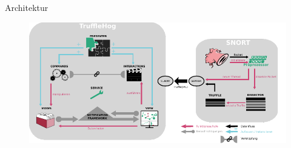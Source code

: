 \begin{frame}{Architektur}
    \begin{figure}
    	\centering
    	\includegraphics[width=\textwidth]{./images/arch/19.pdf}
    \end{figure}
\end{frame}
